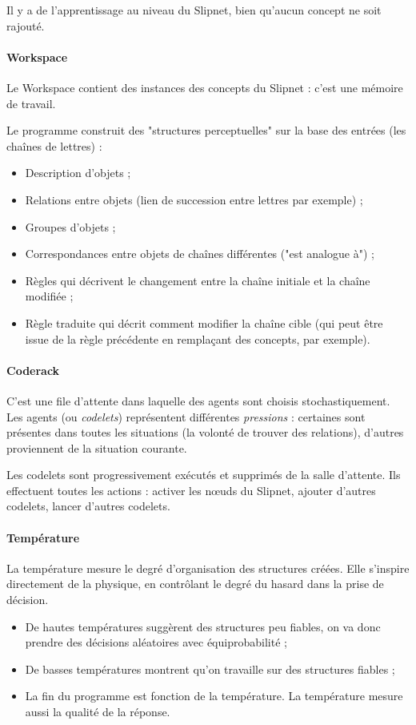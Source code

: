 \documentclass[a4paper, 12pt]{article}
\begin{document}
Il y a de l'apprentissage au niveau du Slipnet, bien qu'aucun concept ne soit rajouté.

\paragraph{Workspace}
Le Workspace contient des instances des concepts du Slipnet : c'est une mémoire de travail.

Le programme construit des "structures perceptuelles" sur la base des entrées (les chaînes de lettres) : 
\begin{itemize}
 \item Description d'objets ;
 \item Relations entre objets (lien de succession entre lettres par exemple) ;
 \item Groupes d'objets ;
 \item Correspondances entre objets de chaînes différentes ("est analogue à") ;
 \item Règles qui décrivent le changement entre la chaîne initiale et la chaîne modifiée ;
 \item Règle traduite qui décrit comment modifier la chaîne cible (qui peut être issue de la règle précédente en remplaçant des concepts, par exemple).
\end{itemize}


\paragraph{Coderack}
C'est une file d'attente dans laquelle des agents sont choisis stochastiquement. Les agents (ou \textit{codelets}) représentent différentes \textit{pressions} : certaines sont présentes dans toutes les situations (la volonté de trouver des relations), d'autres proviennent de la situation courante.

Les codelets sont progressivement exécutés et supprimés de la salle d'attente. Ils effectuent toutes les actions : activer les n\oe{}uds du Slipnet, ajouter d'autres codelets, lancer d'autres codelets.


\paragraph{Température}
La température mesure le degré d'organisation des structures créées. Elle s'inspire directement de la physique, en contrôlant le degré du hasard dans la prise de décision.
\begin{itemize}
 \item De hautes températures suggèrent des structures peu fiables, on va donc prendre des décisions aléatoires avec équiprobabilité ;
 \item De basses températures montrent qu'on travaille sur des structures fiables ;
 \item La fin du programme est fonction de la température. La température mesure aussi la qualité de la réponse.
\end{itemize}
\end{document}
